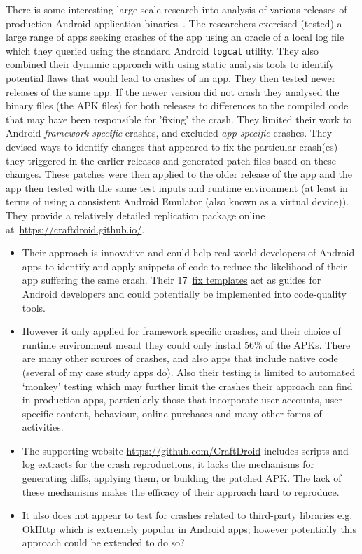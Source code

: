 There is some interesting large-scale research into analysis of various releases of production Android application binaries~\citep{kong2019_mining_android_crash_fixes}. The researchers exercised (tested) a large range of apps seeking crashes of the app using an oracle of a local log file which they queried using the standard Android \texttt{logcat} utility. They also combined their dynamic approach with using static analysis tools to identify potential flaws that would lead to crashes of an app. They then tested newer releases of the same app. If the newer version did not crash they analysed the binary files (the APK files) for both releases to differences to the compiled code that may have been responsible for 'fixing' the crash. They limited their work to Android \emph{framework specific} crashes, and excluded \emph{app-specific} crashes. They devised ways to identify changes that appeared to fix the particular crash(es) they triggered in the earlier releases and generated patch files based on these changes. These patches were then applied to the older release of the app and the app then tested with the same test inputs and runtime environment (at least in terms of using a consistent Android Emulator (also known as a virtual device)). They provide a relatively detailed replication package online at~\url{https://craftdroid.github.io/}.

\begin{itemize}
    \item Their approach is innovative and could help real-world developers of Android apps to identify and apply snippets of code to reduce the likelihood of their app suffering the same crash. Their 17~\href{https://github.com/CraftDroid/ExpData/tree/master/Fix_Templates}{fix templates} act as guides for Android developers and could potentially be implemented into code-quality tools.
    \item However it only applied for framework specific crashes, and their choice of runtime environment meant they could only install 56\% of the APKs. There are many other sources of crashes, and also apps that include native code (several of my case study apps do). Also their testing is limited to automated `monkey' testing which may further limit the crashes their approach can find in production apps, particularly those that incorporate user accounts, user-specific content, behaviour, online purchases and many other forms of activities.
    \item The supporting website \url{https://github.com/CraftDroid} includes scripts and log extracts for the crash reproductions, it lacks the mechanisms for generating diffs, applying them, or building the patched APK. The lack of these mechanisms makes the efficacy of their approach hard to reproduce.
    \item It also does not appear to test for crashes related to third-party libraries e.g. OkHttp which is extremely popular in Android apps; however potentially this approach could be extended to do so?
\end{itemize}

